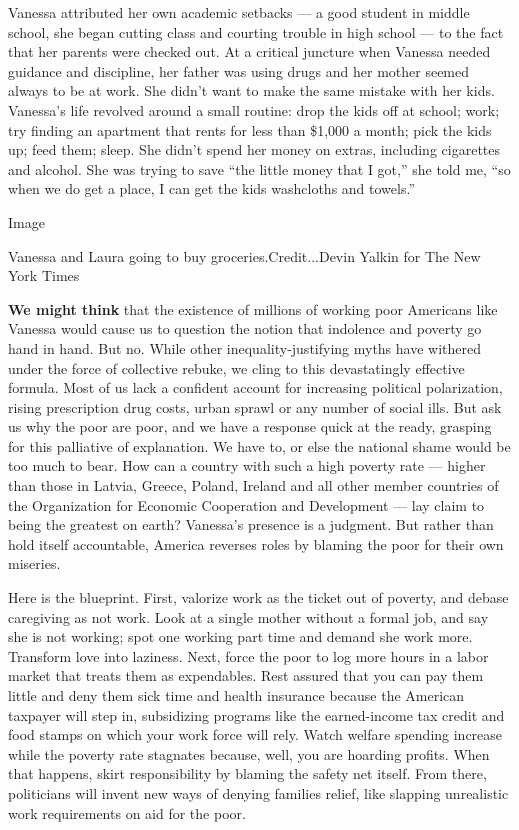 Vanessa attributed her own academic setbacks --- a good student in
middle school, she began cutting class and courting trouble in high
school --- to the fact that her parents were checked out. At a critical
juncture when Vanessa needed guidance and discipline, her father was
using drugs and her mother seemed always to be at work. She didn't want
to make the same mistake with her kids. Vanessa's life revolved around a
small routine: drop the kids off at school; work; try finding an
apartment that rents for less than \$1,000 a month; pick the kids up;
feed them; sleep. She didn't spend her money on extras, including
cigarettes and alcohol. She was trying to save ``the little money that I
got,'' she told me, ``so when we do get a place, I can get the kids
washcloths and towels.''

Image

Vanessa and Laura going to buy groceries.Credit...Devin Yalkin for The
New York Times

\textbf{We might think} that the existence of millions of working poor
Americans like Vanessa would cause us to question the notion that
indolence and poverty go hand in hand. But no. While other
inequality-justifying myths have withered under the force of collective
rebuke, we cling to this devastatingly effective formula. Most of us
lack a confident account for increasing political polarization, rising
prescription drug costs, urban sprawl or any number of social ills. But
ask us why the poor are poor, and we have a response quick at the ready,
grasping for this palliative of explanation. We have to, or else the
national shame would be too much to bear. How can a country with such a
high poverty rate --- higher than those in Latvia, Greece, Poland,
Ireland and all other member countries of the Organization for Economic
Cooperation and Development --- lay claim to being the greatest on
earth? Vanessa's presence is a judgment. But rather than hold itself
accountable, America reverses roles by blaming the poor for their own
miseries.

Here is the blueprint. First, valorize work as the ticket out of
poverty, and debase caregiving as not work. Look at a single mother
without a formal job, and say she is not working; spot one working part
time and demand she work more. Transform love into laziness. Next, force
the poor to log more hours in a labor market that treats them as
expendables. Rest assured that you can pay them little and deny them
sick time and health insurance because the American taxpayer will step
in, subsidizing programs like the earned-income tax credit and food
stamps on which your work force will rely. Watch welfare spending
increase while the poverty rate stagnates because, well, you are
hoarding profits. When that happens, skirt responsibility by blaming the
safety net itself. From there, politicians will invent new ways of
denying families relief, like slapping unrealistic work requirements on
aid for the poor.

